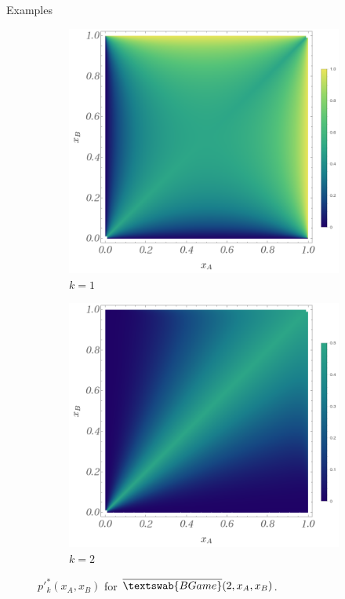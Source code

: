 \documentclass{beamer}
\theoremstyle{definition}
\newcommand{\InfBG}[1]{$\overline{\textswab{BGame}}(#1)$}
\begin{document}
\begin{frame}{Examples}
\begin{figure}[H]
\begin{subfigure}[b]{0.3\textwidth}
        \includegraphics[width=\textwidth]{img/BinomialBayesian_ppk_2_1.png}
        \caption{\small \centering $k=1$}
        \label{fig:ppkBG_2_1}
    \end{subfigure}
    \hspace{0.01\textwidth} %
    \begin{subfigure}[b]{0.3\textwidth}
        \includegraphics[width=\textwidth]{img/BinomialBayesian_ppk_2_2.png}
        \caption{\small \centering $k=2$}
        \label{fig:ppkBG_2_2}
    \end{subfigure}
    
    \caption{\small \centering $p'^*_k(x_A,x_B)$ for \InfBG{2,x_A,x_B}.}
    \label{fig:ppk_InfBG_2_012}
\end{figure}

    
\end{frame}
\end{document}
